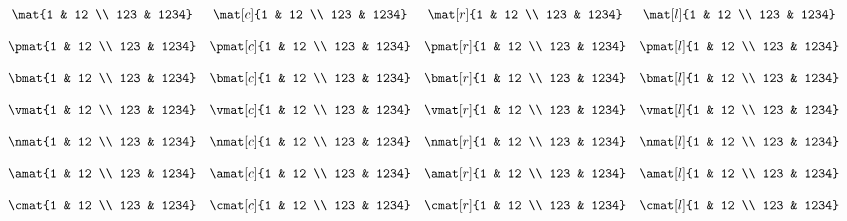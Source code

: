 \documentclass{unittest}
\begin{document}
\(\begin{array}{ccccc}
\\\\%
&	\mat{1 & 12 \\ 123 & 1234}
&	\mat[c]{1 & 12 \\ 123 & 1234}
&	\mat[r]{1 & 12 \\ 123 & 1234}
&	\mat[l]{1 & 12 \\ 123 & 1234}
\\\\%
&	\pmat{1 & 12 \\ 123 & 1234}
&	\pmat[c]{1 & 12 \\ 123 & 1234}
&	\pmat[r]{1 & 12 \\ 123 & 1234}
&	\pmat[l]{1 & 12 \\ 123 & 1234}
\\\\%
&	\bmat{1 & 12 \\ 123 & 1234}
&	\bmat[c]{1 & 12 \\ 123 & 1234}
&	\bmat[r]{1 & 12 \\ 123 & 1234}
&	\bmat[l]{1 & 12 \\ 123 & 1234}
\\\\%
&	\vmat{1 & 12 \\ 123 & 1234}
&	\vmat[c]{1 & 12 \\ 123 & 1234}
&	\vmat[r]{1 & 12 \\ 123 & 1234}
&	\vmat[l]{1 & 12 \\ 123 & 1234}
\\\\%
&	\nmat{1 & 12 \\ 123 & 1234}
&	\nmat[c]{1 & 12 \\ 123 & 1234}
&	\nmat[r]{1 & 12 \\ 123 & 1234}
&	\nmat[l]{1 & 12 \\ 123 & 1234}
\\\\%
&	\amat{1 & 12 \\ 123 & 1234}
&	\amat[c]{1 & 12 \\ 123 & 1234}
&	\amat[r]{1 & 12 \\ 123 & 1234}
&	\amat[l]{1 & 12 \\ 123 & 1234}
\\\\%
&	\cmat{1 & 12 \\ 123 & 1234}
&	\cmat[c]{1 & 12 \\ 123 & 1234}
&	\cmat[r]{1 & 12 \\ 123 & 1234}
&	\cmat[l]{1 & 12 \\ 123 & 1234}
\\\\%
\end{array}\)
\end{document}
